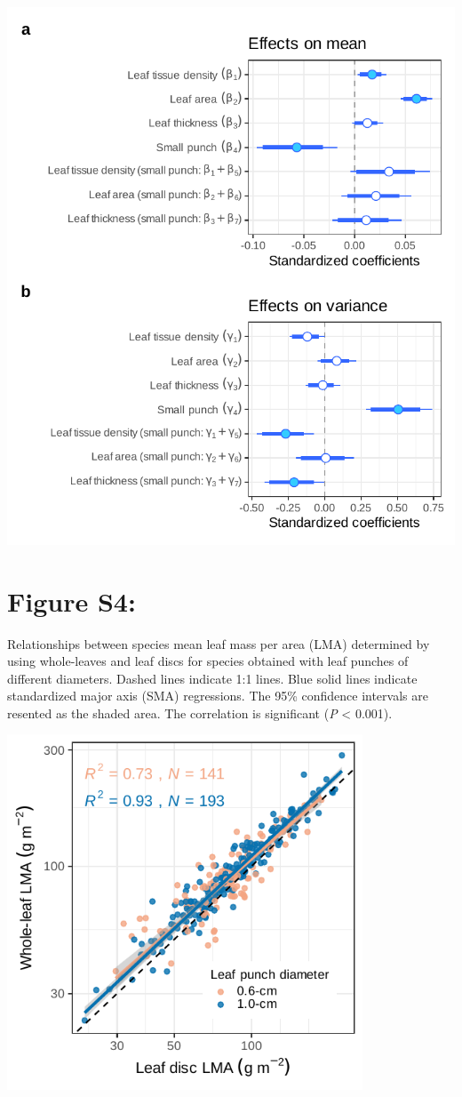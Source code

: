 \documentclass[
  12pt,
]{article}
\begin{document}
\includegraphics{../figs/coef_sp_punch1_add.pdf}

\newpage

\hypertarget{figure-s4}{%
\section{Figure S4:}\label{figure-s4}}

Relationships between species mean leaf mass per area (LMA) determined by using whole-leaves and leaf discs for species obtained with leaf punches of different diameters.
Dashed lines indicate 1:1 lines.
Blue solid lines indicate standardized major axis (SMA) regressions.
The 95\% confidence intervals are resented as the shaded area.
The correlation is significant (\emph{P} \textless{} 0.001).

\includegraphics[width=4.16667in,height=\textheight]{../figs/sma_sep.pdf}
\end{document}
